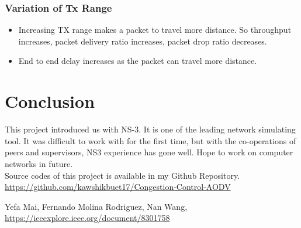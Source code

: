 \documentclass[12pt, a4paper]{article}
\begin{document}
\subsubsection{Variation of Tx Range}
\begin{itemize}
    \item Increasing TX range makes a packet to travel more distance. So throughput increases, packet delivery ratio increases, packet drop ratio decreases. 
    \item End to end delay increases as the packet can travel more distance.
\end{itemize}

\section{Conclusion}
This project introduced us with NS-3. It is one of the leading network simulating tool. It was difficult to work with for the first time, but with the co-operations of peers and supervisors, NS3 experience has gone well. Hope to work on computer networks in future.\\
Source codes of this project is available in my Github Repository. \url{https://github.com/kawshikbuet17/Congestion-Control-AODV}


\begin{thebibliography}{9}
Yefa Mai, Fernando Molina Rodriguez, Nan Wang, \url{https://ieeexplore.ieee.org/document/8301758}
\end{thebibliography}
\end{document}
